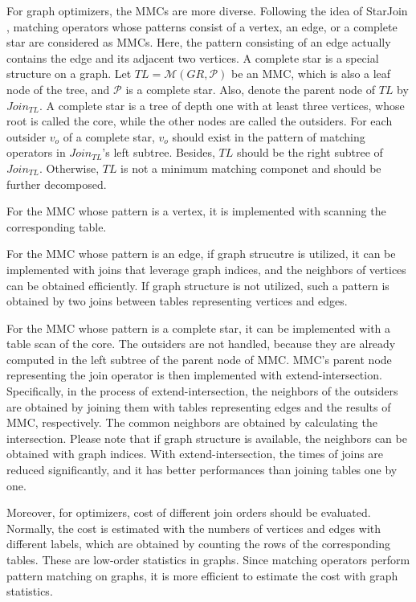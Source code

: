 For graph optimizers, the MMCs are more diverse.
Following the idea of StarJoin \cite{starjoin,huge}, matching operators whose patterns consist of a vertex, an edge, or a complete star are considered as MMCs.
Here, the pattern consisting of an edge actually contains the edge and its adjacent two vertices.
A complete star is a special structure on a graph.
Let $TL = \mathcal{M}(GR, \mathcal{P})$ be an MMC, which is also a leaf node of the tree, and $\mathcal{P}$ is a complete star.
Also, denote the parent node of $TL$ by $Join_{TL}$.
A complete star is a tree of depth one with at least three vertices, whose root is called the core, while the other nodes are called the outsiders.
For each outsider $v_o$ of a complete star, $v_o$ should exist in the pattern of matching operators in $Join_{TL}$'s left subtree.
Besides, $TL$ should be the right subtree of $Join_{TL}$.
Otherwise, $TL$ is not a minimum matching componet and should be further decomposed.

For the MMC whose pattern is a vertex, it is implemented with scanning the corresponding table.

For the MMC whose pattern is an edge, if graph strucutre is utilized, it can be implemented with joins that leverage graph indices, and the neighbors of vertices can be obtained efficiently.
If graph structure is not utilized, such a pattern is obtained by two joins between tables representing vertices and edges.


For the MMC whose pattern is a complete star, it can be implemented with a table scan of the core.
The outsiders are not handled, because they are already computed in the left subtree of the parent node of MMC.
MMC's parent node representing the join operator is then implemented with extend-intersection.
Specifically, in the process of extend-intersection, the neighbors of the outsiders are obtained by joining them with tables representing edges and the results of MMC, respectively.
The common neighbors are obtained by calculating the intersection.
Please note that if graph structure is available, the neighbors can be obtained with graph indices.
With extend-intersection, the times of joins are reduced significantly, and it has better performances than joining tables one by one.


Moreover, for optimizers, cost of different join orders should be evaluated.
Normally, the cost is estimated with the numbers of vertices and edges with different labels, which are obtained by counting the rows of the corresponding tables.
These are low-order statistics in graphs.
Since matching operators perform pattern matching on graphs, it is more efficient to estimate the cost with graph statistics.

